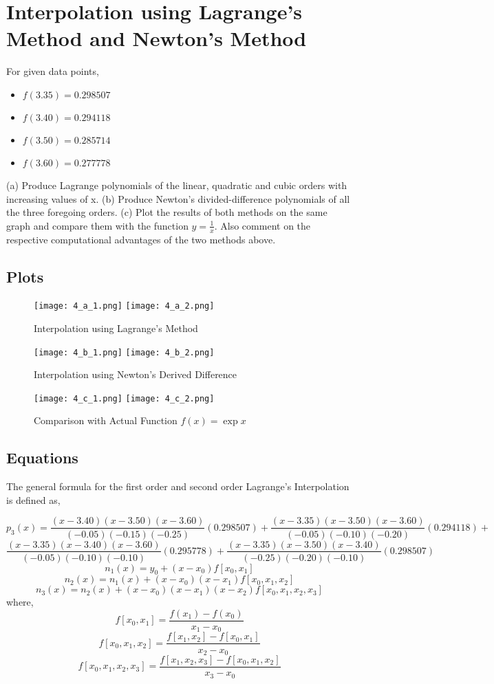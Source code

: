 \documentclass{article}
\begin{document}
\section{Interpolation using Lagrange's Method and Newton's Method}
For given data points,
\begin{itemize}
    \item $f(3.35) = 0.298507$
    \item $f(3.40) = 0.294118$
    \item $f(3.50) = 0.285714$
    \item $f(3.60) = 0.277778$
\end{itemize}
(a) Produce Lagrange polynomials of the linear, quadratic and cubic orders with increasing values of x.
(b) Produce Newton’s divided-difference polynomials of all the three foregoing orders.
(c) Plot the results of both methods on the same graph and compare them with the function $y = \frac{1}{x}$. Also comment on the respective computational advantages of the two methods above.
\subsection{Plots}
\begin{figure}[!h]
    \centering
    \texttt{[image: 4\_a\_1.png]}
    \texttt{[image: 4\_a\_2.png]}
    \caption{Interpolation using Lagrange's Method}
\end{figure}
\newpage
\begin{figure}[!h]
    \centering
    \texttt{[image: 4\_b\_1.png]}
    \texttt{[image: 4\_b\_2.png]}
    \caption{Interpolation using Newton's Derived Difference}
\end{figure}
\begin{figure}[!h]
    \centering
    \texttt{[image: 4\_c\_1.png]}
    \texttt{[image: 4\_c\_2.png]}
    \caption{Comparison with Actual Function $f(x) = \exp{x}$}
\end{figure}
\subsection{Equations}
The general formula for the first order and second order  Lagrange's Interpolation is defined as,

$$p_3(x) = \frac{(x-3.40)(x-3.50)(x-3.60)}{(-0.05)(-0.15)(-0.25)}(0.298507) + \frac{(x-3.35)(x-3.50)(x-3.60)}{(-0.05)(-0.10)(-0.20)}(0.294118) +$$$$ \frac{(x-3.35)(x-3.40)(x-3.60)}{(-0.05)(-0.10)(-0.10)}(0.295778) +
\frac{(x-3.35)(x-3.50)(x-3.40)}{(-0.25)(-0.20)(-0.10)}(0.298507)$$
$$n_1(x) = y_0 + (x-x_0)f[x_0,x_1]$$
$$n_2(x) = n_1(x) + (x-x_0)(x-x_1)f[x_0,x_1,x_2]$$
$$n_3(x) = n_2(x) + (x-x_0)(x-x_1)(x-x_2)f[x_0,x_1,x_2,x_3]$$
where,
$$f[x_0,x_1] = \frac{f(x_1)-f(x_0)}{x_1-x_0}$$
$$f[x_0,x_1,x_2] = \frac{f[x_1,x_2]-f[x_0,x_1]}{x_2-x_0}$$
$$f[x_0,x_1,x_2,x_3] = \frac{f[x_1,x_2,x_3] - f[x_0,x_1,x_2]}{x_3-x_0}$$
\end{document}
